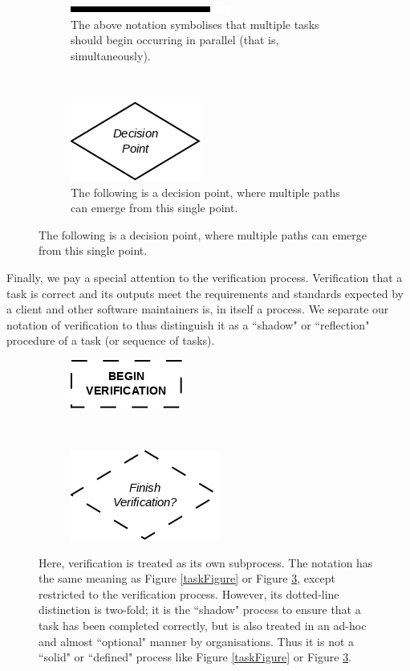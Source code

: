 \begin{figure}[ht!]
\centering
\begin{subfigure}[b]{.45\textwidth}
\centering
\includegraphics[scale=0.6]{media/Parallelised}
\caption{The above notation symbolises that multiple tasks should begin occurring in parallel (that
		is, simultaneously).}
\label{parFigure}
\end{subfigure}
~
\begin{subfigure}[b]{.45\textwidth}
\centering
\includegraphics[scale=0.6]{media/Branching}
\caption{The following is a decision point, where multiple paths can emerge from this single point.}
\label{branFigure}
\end{subfigure}
\end{figure}

Finally, we pay a special attention to the verification process.
Verification that a task is correct and its outputs meet the requirements and standards expected by a client
and other software maintainers is, in itself a process.
We separate our notation of verification to thus distinguish it as a ``shadow" or ``reflection"
procedure of a task (or sequence of tasks).

\begin{figure}[ht!]
\centering
\begin{subfigure}[b]{.45\textwidth}
\centering
\includegraphics[scale=0.6]{media/BeginVerification}
\end{subfigure}
~
\begin{subfigure}[b]{.45\textwidth}
\centering
\includegraphics[scale=0.6]{media/EndVerification}
\end{subfigure}
\caption{Here, verification is treated as its own subprocess. The notation has the same meaning as
	Figure \ref{taskFigure} or Figure \ref{branFigure}, except restricted to the verification process.
	However, its dotted-line distinction is
	two-fold; it is the ``shadow" process to ensure that a task has been completed correctly, but is
		also treated in an ad-hoc and almost ``optional" manner by organisations.
		Thus it is not a ``solid" or ``defined" process like Figure \ref{taskFigure} or Figure \ref{branFigure}.}
\label{verification}
\end{figure}

